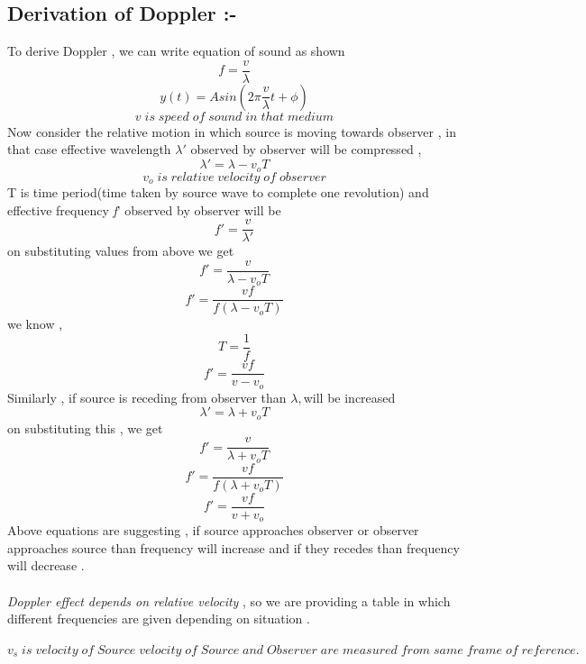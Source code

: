 \documentclass[journal,12pt,twocolumn]{IEEEtran}
\theoremstyle{remark}
\begin{document}
\subsection*{\textbf{Derivation \;of \;Doppler :-}}
To derive Doppler , we can write equation of sound as shown
$$f = \frac{v}{\lambda}$$
$$y(t) = Asin( 2 \pi \frac{v}{\lambda}t + \phi ) $$  
$$v \;is\; speed\; of\; sound\; in\; that\; medium$$
Now consider the relative motion in which source is moving towards observer , in that case effective wavelength $\lambda'$ observed by observer will be compressed ,
$$\lambda' = \lambda - v_o T$$
$$v_o \;is\; relative\; velocity\; of\; observer$$
T is time period(time taken by source wave to complete one revolution)
and effective frequency \textit{f}' observed by observer will be
$$f' = \frac{v}{\lambda'}$$
on substituting values from above we get
$$f' = \frac{v}{\lambda- v_o T}$$
$$f' = \frac{v f}{f(\lambda- v_o T)}$$
we know ,
$$T = \frac{1}{f}$$
$$f' = \frac{v f}{v- v_o }$$
\bigskip
Similarly , if source is receding from observer than $\lambda, $will be increased
$$\lambda' = \lambda + v_o T$$
on substituting this , we get
$$f' = \frac{v}{\lambda+v_o T}$$
$$f' = \frac{v f}{f(\lambda+v_o T)}$$
$$f' = \frac{v f}{v+ v_o }$$
Above equations are suggesting , if source approaches observer or observer approaches source than frequency will increase and if they recedes than frequency will decrease .\\\\
\textit{Doppler effect depends on relative velocity }, so we are providing a table in which different frequencies are given depending on situation .
\newpage

    \begin{table}[h]
        
    \end{table}

   $v_s\; is\; velocity\; of\; Source\; velocity\; of\; Source\; and\; Observer\; are\; measured\; from\; same\; frame\; of \;reference .$
    
\end{document}
